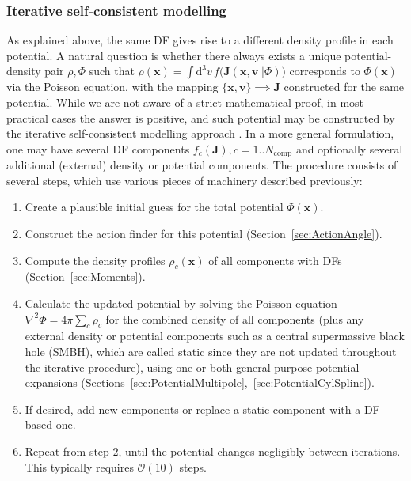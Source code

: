 \documentclass[12pt]{article}
\renewcommand{\d}{\mathrm{d}}
\newcommand{\bv}{\boldsymbol{v}}
\newcommand{\bx}{\boldsymbol{x}}
\newcommand{\bJ}{\boldsymbol{J}}
\begin{document}
\subsubsection{Iterative self-consistent modelling}  \label{sec:SCM}

As explained above, the same DF gives rise to a different density profile in each potential. A natural question is whether there always exists a unique potential-density pair $\rho,\Phi$ such that $\rho(\bx)=\int \d ^3v\,f\big(\bJ(\bx,\bv\;|\Phi)\big)$ corresponds to $\Phi(\bx)$ via the Poisson equation, with the mapping $\{\bx,\bv\}\implies \bJ$ constructed for the same potential.
While we are not aware of a strict mathematical proof, in most practical cases the answer is positive, and such potential may be constructed by the iterative self-consistent modelling approach \cite{Binney2014,Piffl2015}. 
In a more general formulation, one may have several DF components $f_c(\bJ), c=1..N_\mathrm{comp}$ and optionally several additional (external) density or potential components. The procedure consists of several steps, which use various pieces of machinery described previously:
\begin{enumerate}  \setlength{\parskip}{2pt} \setlength{\itemsep}{2pt}
\item Create a plausible initial guess for the total potential $\Phi(\bx)$.
\item Construct the action finder for this potential (Section~\ref{sec:ActionAngle}).
\item Compute the density profiles $\rho_c(\bx)$ of all components with DFs (Section~\ref{sec:Moments}).
\item Calculate the updated potential by solving the Poisson equation $\nabla^2\Phi = 4\pi\sum_c\rho_c$ for the combined density of all components (plus any external density or potential components such as a central supermassive black hole (SMBH), which are called static since they are not updated throughout the iterative procedure), using one or both general-purpose potential expansions (Sections~\ref{sec:PotentialMultipole},~\ref{sec:PotentialCylSpline}).
\item If desired, add new components or replace a static component with a DF-based one.
\item Repeat from step 2, until the potential changes negligibly between iterations. This typically requires $\mathcal{O}(10)$ steps.
\end{enumerate}
\end{document}
